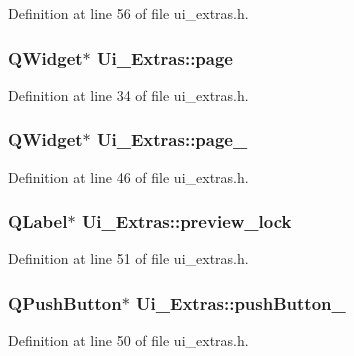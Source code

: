 Definition at line 56 of file ui\_\-extras.h.

\hypertarget{classUi__Extras_a4f4b0eb303e7bd48ab30a1d3cd0e0b32}{
\subsubsection[{page}]{\setlength{\rightskip}{0pt plus 5cm}QWidget$\ast$ {\bf Ui\_\-Extras::page}}}
\label{classUi__Extras_a4f4b0eb303e7bd48ab30a1d3cd0e0b32}


Definition at line 34 of file ui\_\-extras.h.

\hypertarget{classUi__Extras_a328f350266fb266b688ca9e27b47ccfe}{
\subsubsection[{page\_\-2}]{\setlength{\rightskip}{0pt plus 5cm}QWidget$\ast$ {\bf Ui\_\-Extras::page\_}}}
\label{classUi__Extras_a328f350266fb266b688ca9e27b47ccfe}


Definition at line 46 of file ui\_\-extras.h.

\hypertarget{classUi__Extras_ac4781c1e6ae1e2480713db1da125fe03}{
\subsubsection[{preview\_\-lock}]{\setlength{\rightskip}{0pt plus 5cm}QLabel$\ast$ {\bf Ui\_\-Extras::preview\_\-lock}}}
\label{classUi__Extras_ac4781c1e6ae1e2480713db1da125fe03}


Definition at line 51 of file ui\_\-extras.h.

\hypertarget{classUi__Extras_a6203cc72861a2bf0165a5190c11c2698}{
\subsubsection[{pushButton\_\-10}]{\setlength{\rightskip}{0pt plus 5cm}QPushButton$\ast$ {\bf Ui\_\-Extras::pushButton\_}}}
\label{classUi__Extras_a6203cc72861a2bf0165a5190c11c2698}


Definition at line 50 of file ui\_\-extras.h.

